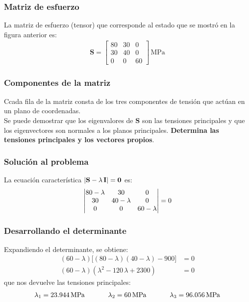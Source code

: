 \documentclass[12pt]{beamer}
\begin{document}
\begin{frame}
\frametitle{Matriz de esfuerzo}
La matriz de esfuerzo (tensor) que corresponde al estado que se mostró en la figura anterior es:
\pause
\begin{align*}
\mathbf{S} = 
\begin{bmatrix}
80 & 30 & 0 \\
30 & 40 & 0 \\
0 & 0 & 60
\end{bmatrix}
\, \text{MPa}
\end{align*}
\end{frame}
\begin{frame}
\frametitle{Componentes de la matriz}
Ccada fila de la matriz consta de los tres componentes de tensión que actúan en un plano de coordenadas.
\\
\bigskip
\pause
Se puede demostrar que los eigenvalores de $\mathbf{S}$ son las tensiones principales y que los eigenvectores son normales a los planos principales. \pause \textbf{Determina las tensiones principales y los vectores propios}.
\end{frame}
\begin{frame}
\frametitle{Solución al problema}
La ecuación característica $\abs{\mathbf{S} - \lambda \, \mathbf{I}} = \mathbf{0}$ es:
\pause
\begin{align*}
\mdet{
80 - \lambda & 30 & 0 \\
30 & 40 - \lambda & 0 \\
0 & 0 & 60 - \lambda
} = 0
\end{align*}
\end{frame}
\begin{frame}
\frametitle{Desarrollando el determinante}
Expandiendo el determinante, se obtiene:
\pause
\begin{align*}
(60 - \lambda) \big[ (80 - \lambda) (40 - \lambda) - 900 \big] &= 0 \\[0.5em]
(60 - \lambda) (\lambda^{2} - 120 \, \lambda + 2300) &= 0
\end{align*}
\pause
que nos devuelve las tensiones principales:
\pause
\begin{align*}
\lambda_{1} = \SI{23.944}{\mega\pascal} \hspace{1.2cm} \lambda_{2} = \SI{60}{\mega\pascal} \hspace{1.2cm} \lambda_{3} = \SI{96.056}{\mega\pascal}
\end{align*}
\end{frame}
\end{document}
